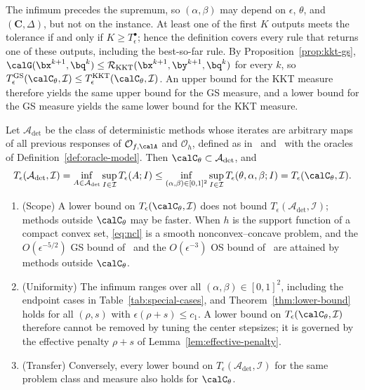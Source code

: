 The infimum precedes the supremum, so \((\alpha,\beta)\) may depend on
\(\epsilon\), \(\theta\), and \((\mathbf C,\Delta)\), but not on the instance.
At least one of the first \(K\) outputs meets the tolerance if and only if
\(K\ge T^{\bullet}_\epsilon\); hence the definition covers every rule that
returns one of these outputs, including the best-so-far rule. By
Proposition~\ref{prop:kkt-gs},
\(\calG(\bx^{k+1},\bq^k)\le\mathcal R_{\mathrm{KKT}}(\bx^{k+1},\by^{k+1},\bq^k)\)
for every \(k\), so
\(T^{\mathrm{GS}}_\epsilon(\calC_\theta,\mathcal I)
\le T^{\mathrm{KKT}}_\epsilon(\calC_\theta,\mathcal I)\). An upper bound for
the KKT measure therefore yields the same upper bound for the GS measure, and
a lower bound for the GS measure yields the same lower bound for the KKT
measure.

\begin{remark}
\label{rem:family-not-oracle}
Let \(\mathcal A_{\det}\) be the class of deterministic methods whose iterates
are arbitrary maps of all previous responses of \(\mathcal O_{f,\calA}\) and
\(\mathcal O_h\), defined as in~\cite[Section~2.2]{carmon2020lower}
and~\cite[Definition~2.5]{pan2026optimal} with the oracles of
Definition~\ref{def:oracle-model}. Then \(\calC_\theta\subset\mathcal A_{\det}\), and
\[
    T_\epsilon(\mathcal A_{\det},\mathcal I)
    =\inf_{A\in\mathcal A_{\det}}\sup_{I\in\mathcal I}T_\epsilon(A;I)
    \le\inf_{(\alpha,\beta)\in[0,1]^2}\sup_{I\in\mathcal I}
    T_\epsilon(\theta,\alpha,\beta;I)
    =T_\epsilon(\calC_\theta,\mathcal I).
\]
\begin{enumerate}[label=(\roman*)]
\item (Scope) A lower bound on \(T_\epsilon(\calC_\theta,\mathcal I)\) does not
  bound \(T_\epsilon(\mathcal A_{\det},\mathcal I)\); methods outside
  \(\calC_\theta\) may be faster. When \(h\) is the support function of a
  compact convex set, \eqref{eq:ncl} is a smooth nonconvex--concave problem,
  and the \(O(\epsilon^{-5/2})\) GS bound of~\cite{zhang2026matching} and the
  \(O(\epsilon^{-3})\) OS bound of~\cite{pan2026optimal} are attained by
  methods outside \(\calC_\theta\).
\item (Uniformity) The infimum ranges over all \((\alpha,\beta)\in[0,1]^2\),
  including the endpoint cases in Table~\ref{tab:special-cases}, and
  Theorem~\ref{thm:lower-bound} holds for all \((\rho,s)\) with
  \(\epsilon(\rho+s)\le c_1\). A lower bound on
  \(T_\epsilon(\calC_\theta,\mathcal I)\) therefore cannot be removed by
  tuning the center stepsizes; it is governed by the effective penalty
  \(\rho+s\) of Lemma~\ref{lem:effective-penalty}.
\item (Transfer) Conversely, every lower bound on
  \(T_\epsilon(\mathcal A_{\det},\mathcal I)\) for the same problem class and
  measure also holds for \(\calC_\theta\).
\end{enumerate}
\end{remark}

